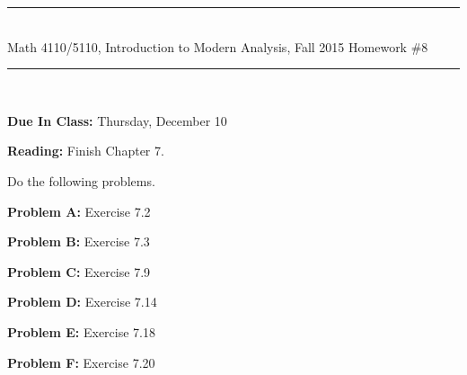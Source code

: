 \documentclass[11pt,reqno]{amsart}
\newcommand{\spacer}{\vspace{.4cm}}
\begin{document}
\begin{center}
\hrule \ \\
\large \textsf{Math 4110/5110, Introduction to Modern Analysis, Fall 2015} \hfill
\Large Homework \#8 \vspace{.25cm} \hrule \
\end{center}

\spacer

\textbf{Due In Class:} Thursday, December 10  \spacer

\textbf{Reading:} Finish Chapter 7. \spacer

Do the following problems. \spacer

\textbf{Problem A:} Exercise 7.2 \spacer

\textbf{Problem B:} Exercise 7.3  \spacer

\textbf{Problem C:} Exercise 7.9  \spacer

\textbf{Problem D:} Exercise 7.14 \spacer

\textbf{Problem E:} Exercise 7.18 \spacer

\textbf{Problem F:} Exercise 7.20
\end{document}

